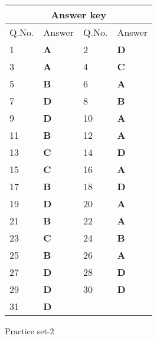 \begin{table}[H]
	\centering
	\begin{tabular}{|p{1.5cm}|p{1.5cm}||p{1.5cm}|p{1.5cm}|}
		\hline
		\multicolumn{4}{|c|}{\textbf{Answer key}}\\\hline\hline
		\rowcolor{ocrel}Q.No.&Answer&Q.No.&Answer\\\hline
		1&\textbf{A} &2&\textbf{D}\\\hline 
		3&\textbf{A} &4&\textbf{C} \\\hline
		5&\textbf{B} &6&\textbf{A} \\\hline
		7&\textbf{D}&8&\textbf{B}\\\hline
		9&\textbf{D}&10&\textbf{A}\\\hline
		11&\textbf{B} &12&\textbf{A}\\\hline
		13&\textbf{C}&14&\textbf{D}\\\hline
		15&\textbf{C}&16&\textbf{A} \\\hline
		17&\textbf{B}&18&\textbf{D}\\\hline
		19&\textbf{D}&20&\textbf{A}\\\hline
		21&\textbf{B} &22&\textbf{A}\\\hline
		23&\textbf{C}&24&\textbf{B}\\\hline
		25&\textbf{B}&26&\textbf{A} \\\hline
		27&\textbf{D}&28&\textbf{D}\\\hline
		29&\textbf{D}&30&\textbf{D}\\\hline
		31&\textbf{D} &&\textbf{}\\\hline
	\end{tabular}
\end{table}
\newpage
\begin{abox}
	Practice set-2
\end{abox}
